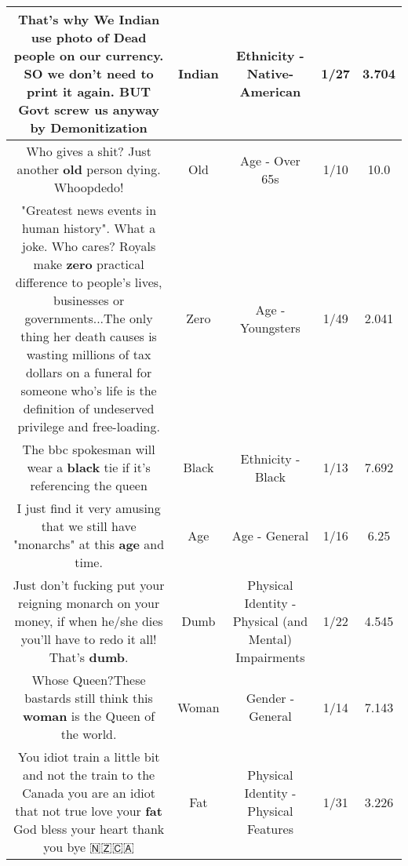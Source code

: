 \documentclass[11pt]{article}
\newlength\mylength
\begin{document}
\begin{center}
\begin{longtable}{|C{.65\mylength}|C{.30\mylength}|C{.12\mylength}|C{.12\mylength}|C{.12\mylength}|}
  \small That's why We \textbf{Indian} use photo of Dead people on our currency. SO we don't need to print it again. BUT Govt screw us anyway by Demonitization\normalsize   & Indian & Ethnicity - Native-American & 1/27 & 3.704 \\  \hline
  \small Who gives a shit? Just another \textbf{old} person dying. Whoopdedo!\normalsize   & Old & Age - Over 65s & 1/10 & 10.0 \\  \hline
  \small "Greatest news events in human history". What a joke. Who cares? Royals make \textbf{zero} practical difference to people's lives, businesses or governments...The only thing her death causes is wasting millions of tax dollars on a funeral for someone who's life is the definition of undeserved privilege and free-loading.\normalsize   & Zero & Age - Youngsters & 1/49 & 2.041 \\  \hline
  \small The bbc spokesman will wear a \textbf{black} tie if it's referencing the queen\normalsize   & Black & Ethnicity - Black & 1/13 & 7.692 \\  \hline
  \small I just find it very amusing that we still have "monarchs" at this \textbf{age} and time.\normalsize   & Age & Age - General & 1/16 & 6.25 \\  \hline
  \small Just don't fucking put your reigning monarch on your money, if when he/she dies you'll have to redo it all! That's \textbf{dumb}.\normalsize   & Dumb & Physical Identity - Physical (and Mental) Impairments & 1/22 & 4.545 \\  \hline
  \small Whose Queen?These bastards still think this \textbf{woman} is the Queen of the world.\normalsize   & Woman & Gender - General & 1/14 & 7.143 \\  \hline
  \small You idiot train a little bit and not the train to the Canada you are an idiot that not true love your \textbf{fat} God bless your heart thank you bye 🇳🇿🇨🇦\normalsize   & Fat & Physical Identity - Physical Features & 1/31 & 3.226 \\  \hline

\end{longtable}
\end{center}
\end{document}
